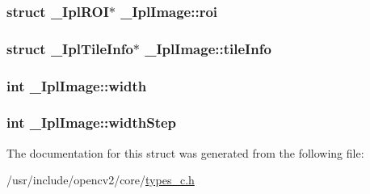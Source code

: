 \hypertarget{struct__IplImage_a697184a2da29652d664ae540ec36839b}{
\subsubsection[{roi}]{\setlength{\rightskip}{0pt plus 5cm}struct {\bf \-\_\-\-Ipl\-R\-O\-I}$\ast$ \-\_\-\-Ipl\-Image\-::roi}}\label{struct__IplImage_a697184a2da29652d664ae540ec36839b}
\hypertarget{struct__IplImage_a3901b044f1243c6f50ff24f68b599796}{
\subsubsection[{tile\-Info}]{\setlength{\rightskip}{0pt plus 5cm}struct \-\_\-\-Ipl\-Tile\-Info$\ast$ \-\_\-\-Ipl\-Image\-::tile\-Info}}\label{struct__IplImage_a3901b044f1243c6f50ff24f68b599796}
\hypertarget{struct__IplImage_af6e81897beca2d2d9914949912cd7b32}{
\subsubsection[{width}]{\setlength{\rightskip}{0pt plus 5cm}int \-\_\-\-Ipl\-Image\-::width}}\label{struct__IplImage_af6e81897beca2d2d9914949912cd7b32}
\hypertarget{struct__IplImage_aca744fd03a4a3ccf8b896798a09c2784}{
\subsubsection[{width\-Step}]{\setlength{\rightskip}{0pt plus 5cm}int \-\_\-\-Ipl\-Image\-::width\-Step}}\label{struct__IplImage_aca744fd03a4a3ccf8b896798a09c2784}


The documentation for this struct was generated from the following file\-:\begin{DoxyCompactItemize}
\item 
/usr/include/opencv2/core/\hyperlink{core_2types__c_8h}{types\-\_\-c.\-h}\end{DoxyCompactItemize}
